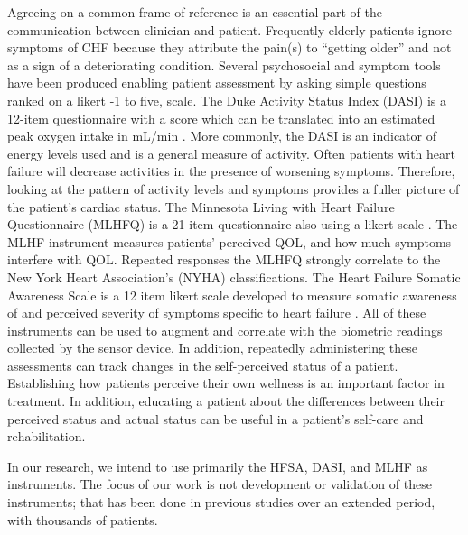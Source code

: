 Agreeing on a common frame of reference is an essential part of the communication between clinician and patient.  Frequently elderly patients ignore symptoms of CHF because they attribute the pain(s) to “getting older” and not as a sign of a deteriorating condition. Several psychosocial and symptom tools have been produced enabling patient assessment by asking simple questions ranked on a likert -1 to five, scale. The Duke Activity Status Index (DASI) is a 12-item questionnaire with a score which can be translated into an estimated peak oxygen intake in mL/min \cite{Hlatky1989}. More commonly, the DASI is an indicator of energy levels used and is a general measure of activity.  Often patients with heart failure will decrease activities in the presence of worsening symptoms. Therefore, looking at the pattern of activity levels and symptoms provides a fuller picture of the patient's cardiac status. The Minnesota Living with Heart Failure Questionnaire (MLHFQ) is a 21-item questionnaire also using a likert scale \cite{Jurgens2009}. The MLHF-instrument measures patients' perceived QOL, and how much symptoms interfere with QOL. Repeated responses the MLHFQ strongly correlate to the New York Heart Association's (NYHA) classifications. The Heart Failure Somatic Awareness Scale is a 12 item likert scale developed to measure somatic awareness of and perceived severity of symptoms specific to heart failure \cite{Jurgens2006}. All of these instruments can be used to augment and correlate with the biometric readings collected by the sensor device. In addition, repeatedly administering these assessments can track changes in the self-perceived status of a patient. Establishing how patients perceive their own wellness is an important factor in treatment. In addition, educating a patient about the differences between their perceived status and actual status can be useful in a patient's self-care and rehabilitation.

In our research, we intend to use primarily the HFSA, DASI, and MLHF as instruments. The focus of our work is not development or validation of these instruments; that has been done in previous studies over an extended period, with thousands of patients.

